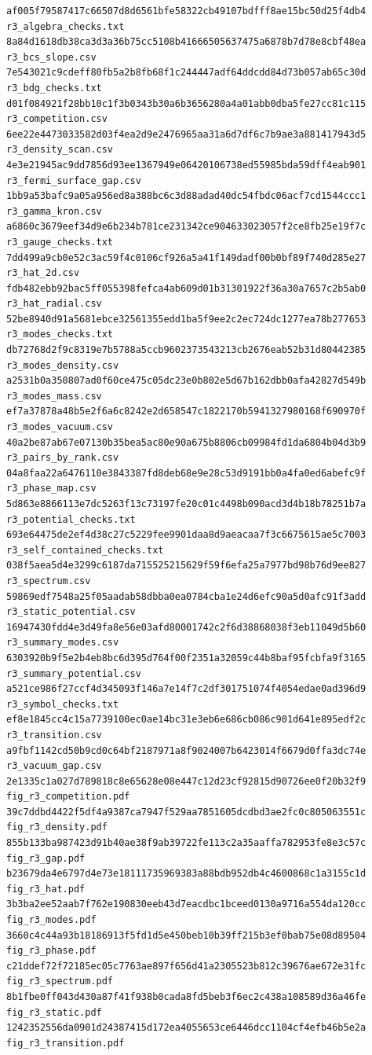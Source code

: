 \documentclass[
  10pt,
]{article}
\begin{document}
\begin{verbatim}
af005f79587417c66507d8d6561bfe58322cb49107bdfff8ae15bc50d25f4db4  r3_algebra_checks.txt
8a84d1618db38ca3d3a36b75cc5108b41666505637475a6878b7d78e8cbf48ea  r3_bcs_slope.csv
7e543021c9cdeff80fb5a2b8fb68f1c244447adf64ddcdd84d73b057ab65c30d  r3_bdg_checks.txt
d01f084921f28bb10c1f3b0343b30a6b3656280a4a01abb0dba5fe27cc81c115  r3_competition.csv
6ee22e4473033582d03f4ea2d9e2476965aa31a6d7df6c7b9ae3a881417943d5  r3_density_scan.csv
4e3e21945ac9dd7856d93ee1367949e06420106738ed55985bda59dff4eab901  r3_fermi_surface_gap.csv
1bb9a53bafc9a05a956ed8a388bc6c3d88adad40dc54fbdc06acf7cd1544ccc1  r3_gamma_kron.csv
a6860c3679eef34d9e6b234b781ce231342ce904633023057f2ce8fb25e19f7c  r3_gauge_checks.txt
7dd499a9cb0e52c3ac59f4c0106cf926a5a41f149dadf00b0bf89f740d285e27  r3_hat_2d.csv
fdb482ebb92bac5ff055398fefca4ab609d01b31301922f36a30a7657c2b5ab0  r3_hat_radial.csv
52be8940d91a5681ebce32561355edd1ba5f9ee2c2ec724dc1277ea78b277653  r3_modes_checks.txt
db72768d2f9c8319e7b5788a5ccb9602373543213cb2676eab52b31d80442385  r3_modes_density.csv
a2531b0a350807ad0f60ce475c05dc23e0b802e5d67b162dbb0afa42827d549b  r3_modes_mass.csv
ef7a37878a48b5e2f6a6c8242e2d658547c1822170b5941327980168f690970f  r3_modes_vacuum.csv
40a2be87ab67e07130b35bea5ac80e90a675b8806cb09984fd1da6804b04d3b9  r3_pairs_by_rank.csv
04a8faa22a6476110e3843387fd8deb68e9e28c53d9191bb0a4fa0ed6abefc9f  r3_phase_map.csv
5d863e8866113e7dc5263f13c73197fe20c01c4498b090acd3d4b18b78251b7a  r3_potential_checks.txt
693e64475de2ef4d38c27c5229fee9901daa8d9aeacaa7f3c6675615ae5c7003  r3_self_contained_checks.txt
038f5aea5d4e3299c6187da715525215629f59f6efa25a7977bd98b76d9ee827  r3_spectrum.csv
59869edf7548a25f05aadab58dbba0ea0784cba1e24d6efc90a5d0afc91f3add  r3_static_potential.csv
16947430fdd4e3d49fa8e56e03afd80001742c2f6d38868038f3eb11049d5b60  r3_summary_modes.csv
6303920b9f5e2b4eb8bc6d395d764f00f2351a32059c44b8baf95fcbfa9f3165  r3_summary_potential.csv
a521ce986f27ccf4d345093f146a7e14f7c2df301751074f4054edae0ad396d9  r3_symbol_checks.txt
ef8e1845cc4c15a7739100ec0ae14bc31e3eb6e686cb086c901d641e895edf2c  r3_transition.csv
a9fbf1142cd50b9cd0c64bf2187971a8f9024007b6423014f6679d0ffa3dc74e  r3_vacuum_gap.csv
2e1335c1a027d789818c8e65628e08e447c12d23cf92815d90726ee0f20b32f9  fig_r3_competition.pdf
39c7ddbd4422f5df4a9387ca7947f529aa7851605dcdbd3ae2fc0c805063551c  fig_r3_density.pdf
855b133ba987423d91b40ae38f9ab39722fe113c2a35aaffa782953fe8e3c57c  fig_r3_gap.pdf
b23679da4e6797d4e73e18111735969383a88bdb952db4c4600868c1a3155c1d  fig_r3_hat.pdf
3b3ba2ee52aab7f762e190830eeb43d7eacdbc1bceed0130a9716a554da120cc  fig_r3_modes.pdf
3660c4c44a93b18186913f5fd1d5e450beb10b39ff215b3ef0bab75e08d89504  fig_r3_phase.pdf
c21ddef72f72185ec05c7763ae897f656d41a2305523b812c39676ae672e31fc  fig_r3_spectrum.pdf
8b1fbe0ff043d430a87f41f938b0cada8fd5beb3f6ec2c438a108589d36a46fe  fig_r3_static.pdf
1242352556da0901d24387415d172ea4055653ce6446dcc1104cf4efb46b5e2a  fig_r3_transition.pdf
\end{verbatim}
\end{document}
